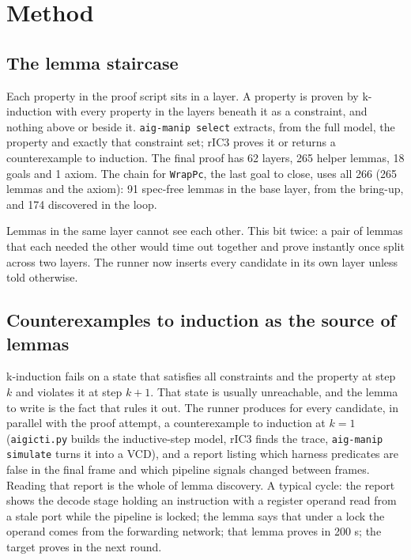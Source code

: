 \documentclass[11pt]{article}
\newcommand{\code}[1]{\texttt{#1}}
\begin{document}
\section{Method}
\label{sec:method}

\subsection{The lemma staircase}

Each property in the proof script sits in a layer. A property is proven by
k-induction with every property in the layers beneath it as a constraint, and
nothing above or beside it. \code{aig-manip select} extracts, from the full
model, the property and exactly that constraint set; rIC3 proves it or returns
a counterexample to induction. The final proof has 62 layers, 265 helper
lemmas, 18 goals and 1 axiom. The chain for \code{WrapPc}, the last goal to
close, uses all 266 (265 lemmas and the axiom): 91 spec-free lemmas in the
base layer, from the bring-up, and 174 discovered in the loop.

Lemmas in the same layer cannot see each other. This bit twice: a pair of
lemmas that each needed the other would time out together and prove instantly
once split across two layers. The runner now inserts every candidate in its own
layer unless told otherwise.

\subsection{Counterexamples to induction as the source of lemmas}

k-induction fails on a state that satisfies all constraints and the property at
step $k$ and violates it at step $k+1$. That state is usually unreachable, and
the lemma to write is the fact that rules it out. The runner produces for every
candidate, in parallel with the proof attempt, a counterexample to induction at
$k=1$ (\code{aigicti.py} builds the inductive-step model, rIC3 finds the
trace, \code{aig-manip simulate} turns it into a VCD), and a report listing
which harness predicates are false in the final frame and which pipeline
signals changed between frames. Reading that report is the whole of lemma
discovery. A typical cycle: the report shows the decode stage holding an
instruction with a register operand read from a stale port while the pipeline
is locked; the lemma says that under a lock the operand comes from the
forwarding network; that lemma proves in 200 s; the target proves in the next
round.
\end{document}
